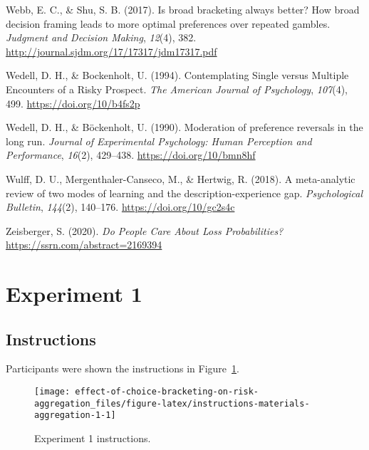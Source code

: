 \documentclass[
  english,
  man, donotrepeattitle,floatsintext]{apa7}
\newlength{\cslhangindent}
\newenvironment{cslreferences}%
  {\setlength{\parindent}{0pt}%
  \everypar{\setlength{\hangindent}{\cslhangindent}}\ignorespaces}%
  {\par}
\theoremstyle{definition}
\theoremstyle{definition}
\theoremstyle{definition}
\theoremstyle{definition}
\theoremstyle{remark}
\begin{document}
\begin{cslreferences}
\leavevmode\hypertarget{ref-webb2017}{}%
Webb, E. C., \& Shu, S. B. (2017). Is broad bracketing always better? How broad decision framing leads to more optimal preferences over repeated gambles. \emph{Judgment and Decision Making}, \emph{12}(4), 382. \url{http://journal.sjdm.org/17/17317/jdm17317.pdf}

\leavevmode\hypertarget{ref-wedell1994}{}%
Wedell, D. H., \& Bockenholt, U. (1994). Contemplating Single versus Multiple Encounters of a Risky Prospect. \emph{The American Journal of Psychology}, \emph{107}(4), 499. \url{https://doi.org/10/b4fs2p}

\leavevmode\hypertarget{ref-wedell1990}{}%
Wedell, D. H., \& Böckenholt, U. (1990). Moderation of preference reversals in the long run. \emph{Journal of Experimental Psychology: Human Perception and Performance}, \emph{16}(2), 429--438. \url{https://doi.org/10/bmn8hf}

\leavevmode\hypertarget{ref-wulff2018}{}%
Wulff, D. U., Mergenthaler-Canseco, M., \& Hertwig, R. (2018). A meta-analytic review of two modes of learning and the description-experience gap. \emph{Psychological Bulletin}, \emph{144}(2), 140--176. \url{https://doi.org/10/gc2s4c}

\leavevmode\hypertarget{ref-zeisberger2020}{}%
Zeisberger, S. (2020). \emph{Do People Care About Loss Probabilities?} \url{https://ssrn.com/abstract=2169394}
\end{cslreferences}

\endgroup

\hypertarget{appendix-appendix}{%
\appendix}


\hypertarget{experiment-1}{%
\section{Experiment 1}\label{experiment-1}}

\hypertarget{instructions-1}{%
\subsection{Instructions}\label{instructions-1}}

Participants were shown the instructions in
Figure~\ref{fig:instructions-materials-aggregation-1}.



\begin{figure}
\texttt{[image: effect-of-choice-bracketing-on-risk-aggregation\_files/figure-latex/instructions-materials-aggregation-1-1]} \caption{Experiment 1 instructions.}\label{fig:instructions-materials-aggregation-1}
\end{figure}
\end{document}
